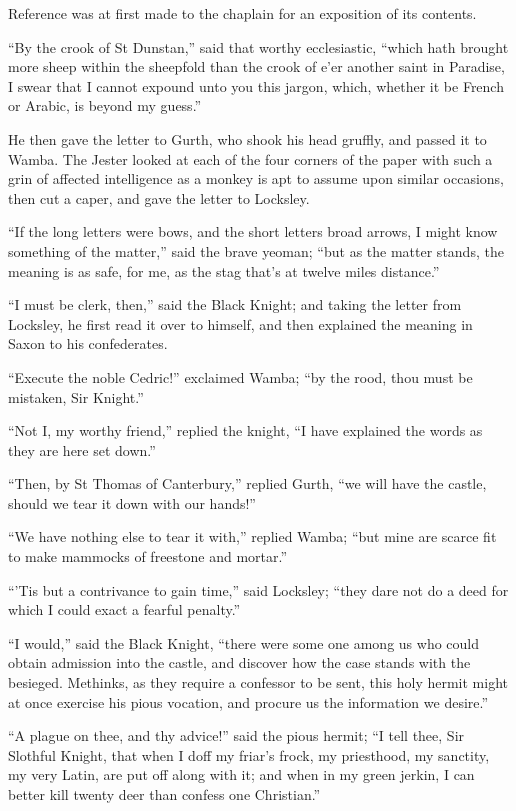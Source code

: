 Reference was at first made to the chaplain for an exposition of its
contents.

``By the crook of St Dunstan,'' said that worthy ecclesiastic, ``which
hath brought more sheep within the sheepfold than the crook of e'er
another saint in Paradise, I swear that I cannot expound unto you this
jargon, which, whether it be French or Arabic, is beyond my guess.''

He then gave the letter to Gurth, who shook his head gruffly, and passed
it to Wamba. The Jester looked at each of the four corners of the paper
with such a grin of affected intelligence as a monkey is apt to assume
upon similar occasions, then cut a caper, and gave the letter to
Locksley.

``If the long letters were bows, and the short letters broad arrows, I
might know something of the matter,'' said the brave yeoman; ``but as
the matter stands, the meaning is as safe, for me, as the stag that's at
twelve miles distance.''

``I must be clerk, then,'' said the Black Knight; and taking the letter
from Locksley, he first read it over to himself, and then explained the
meaning in Saxon to his confederates.

``Execute the noble Cedric!'' exclaimed Wamba; ``by the rood, thou must
be mistaken, Sir Knight.''

``Not I, my worthy friend,'' replied the knight, ``I have explained the
words as they are here set down.''

``Then, by St Thomas of Canterbury,'' replied Gurth, ``we will have the
castle, should we tear it down with our hands!''

``We have nothing else to tear it with,'' replied Wamba; ``but mine are
scarce fit to make mammocks of freestone and mortar.''

``'Tis but a contrivance to gain time,'' said Locksley; ``they dare not
do a deed for which I could exact a fearful penalty.''

``I would,'' said the Black Knight, ``there were some one among us who
could obtain admission into the castle, and discover how the case stands
with the besieged. Methinks, as they require a confessor to be sent,
this holy hermit might at once exercise his pious vocation, and procure
us the information we desire.''

``A plague on thee, and thy advice!'' said the pious hermit; ``I tell
thee, Sir Slothful Knight, that when I doff my friar's frock, my
priesthood, my sanctity, my very Latin, are put off along with it; and
when in my green jerkin, I can better kill twenty deer than confess one
Christian.''


